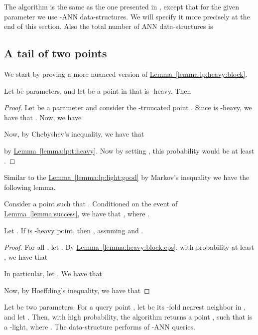 \documentclass[12pt]{article}\usepackage[cm]{fullpage}
\newcommand{\Term}[1]{\textsf{#1}}
\theoremstyle{remark}\theoremheaderfont{\sf}\theorembodyfont{\upshape}\newtheorem{defn}[theorem]{Definition}
\numberwithin{figure}{section}\numberwithin{table}{section}\numberwithin{equation}{section}
\newcommand{\HLink}[2]{\hyperref[#2]{#1~\ref*{#2}}}
\newcommand{\lemlab}[1]{\label{lemma:#1}}
\newcommand{\lemref}[1]{\HLink{Lemma}{lemma:#1}}
\newcommand{\ANN}{\Term{ANN}\xspace}\newcommand{\NN}{\Term{NN}\xspace}
\begin{document}
\smallskip The algorithm is the same as the one presented in
, except that for the given parameter  we
use -\ANN data-structures. We will specify it more
precisely at the end of this section. Also the total number of \ANN
data-structures is 



\subsection{A tail of two points}

We start by proving a more nuanced version of \lemref{lp:heavy:block}.

\begin{lemma}
    \lemlab{heavy:block:eps}Let  be parameters, and let  be a point
    in  that is -heavy.  Then
    
\end{lemma}


\begin{proof}
    Let  be a parameter and consider the
    -truncated point .
    Since  is -heavy, we have that
    .  Now, we
    have
    
    Now, by Chebyshev's inequality, we have that
    
    by \lemref{lp:t:heavy}. Now by setting ,
    this probability would be at least .
\end{proof}

Similar to the \lemref{lp:light:good} by Markov's inequality we have
the following lemma.
\begin{lemma}
    \lemlab{light:good:eps}Consider a point  such that
    . Conditioned on the event of
    \lemref{success}, we have that
    ,
    where .
\end{lemma}
\begin{lemma}
    \lemlab{heavy:far:eps}Let .  If  is
    -heavy point, then
    ,
    assuming  and
    .
\end{lemma}
\begin{proof}For all , let . By
    \lemref{heavy:block:eps}, with probability at least ,
    we have that
    
    In particular, let . We have
    that
    
Now, by Hoeffding's inequality, we have that
    
\end{proof}
\begin{lemma}
    \lemlab{heavy:tail:eps}
Let  be two parameters. For a query point
    , let  be its -fold
    nearest neighbor in , and let
    . Then, with high
    probability, the algorithm returns a point ,
    such that  is a
    -light, where
    . The data-structure performs
     of -\ANN
    queries.
\end{lemma}
\end{document}
